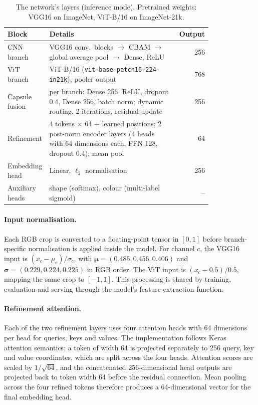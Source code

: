 \begin{table}[t]
  \caption{The network's layers (inference mode). Pretrained weights: VGG16 on ImageNet, ViT-B/16 on ImageNet-21k.}
  \label{tab:arch}
  \centering
  \small
  \begin{tabular}{@{}p{0.19\linewidth}p{0.62\linewidth}r@{}}
    \toprule
    Block & Details & Output \\
    \midrule
    CNN branch & VGG16 conv.\ blocks $\to$ CBAM $\to$ global average pool $\to$ Dense, ReLU & 256 \\
    ViT branch & ViT-B/16 (\texttt{vit-base-patch16-224-in21k}), pooler output & 768 \\
    Capsule fusion & per branch: Dense 256, ReLU, dropout 0.4, Dense 256, batch norm; dynamic routing, 2 iterations,
      residual update & 256 \\
    Refinement & 4 tokens $\times$ 64 + learned positions; 2 post-norm encoder layers (4 heads with 64 dimensions each, FFN 128, dropout
      0.4); mean pool & 64 \\
    Embedding head & Linear, $\ell_2$ normalisation & 256 \\
    Auxiliary heads & shape (softmax), colour (multi-label sigmoid) & -- \\
    \bottomrule
  \end{tabular}
\end{table}

\paragraph{Input normalisation.} Each RGB crop is converted to a floating-point tensor in $[0,1]$ before branch-specific normalisation is applied inside the model. For channel $c$, the VGG16 input is $(x_c-\mu_c)/\sigma_c$, with $\boldsymbol{\mu}=(0.485,0.456,0.406)$ and $\boldsymbol{\sigma}=(0.229,0.224,0.225)$ in RGB order. The ViT input is $(x_c-0.5)/0.5$, mapping the same crop to $[-1,1]$. This processing is shared by training, evaluation and serving through the model's feature-extraction function.

\paragraph{Refinement attention.} Each of the two refinement layers uses four attention heads with 64 dimensions per head for queries, keys and values. The implementation follows Keras attention semantics: a token of width 64 is projected separately to 256 query, key and value coordinates, which are split across the four heads. Attention scores are scaled by $1/\sqrt{64}$, and the concatenated 256-dimensional head outputs are projected back to token width 64 before the residual connection. Mean pooling across the four refined tokens therefore produces a 64-dimensional vector for the final embedding head.

